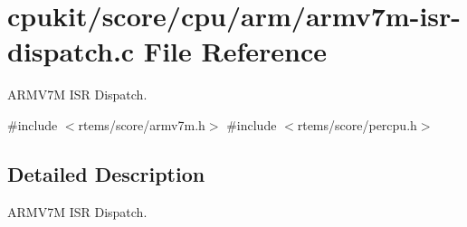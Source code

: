 \hypertarget{armv7m-isr-dispatch_8c}{}\section{cpukit/score/cpu/arm/armv7m-\/isr-\/dispatch.c File Reference}
\label{armv7m-isr-dispatch_8c}


A\+R\+M\+V7M I\+SR Dispatch.  


{\ttfamily \#include $<$rtems/score/armv7m.\+h$>$}\newline
{\ttfamily \#include $<$rtems/score/percpu.\+h$>$}\newline


\subsection{Detailed Description}
A\+R\+M\+V7M I\+SR Dispatch. 

